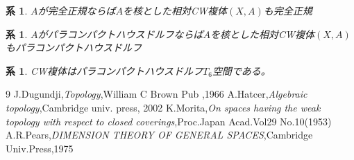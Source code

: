 \documentclass[leqno]{jsarticle}
\newtheorem{cor}[thm]{系}
\begin{document}
\begin{cor}
$A$が完全正規ならば$A$を核とした相対CW複体$(X,A)$も完全正規
\end{cor}

\begin{cor}
$A$がパラコンパクトハウスドルフならば$A$を核とした相対CW複体$(X,A)$もパラコンパクトハウスドルフ
\end{cor}

\begin{cor}
CW複体はパラコンパクトハウスドルフ$T_6$空間である。
\end{cor}
	
\begin{thebibliography}{9}
J.Dugundji,{\it Topology},William C Brown Pub ,1966
A.Hatcer,{\it Algebraic topology},Cambridge univ. press, 2002 
K.Morita,{\it On spaces having the weak topology with respect to closed coverings},Proc.Japan Acad.Vol29 No.10(1953)
A.R.Pears,{\it DIMENSION THEORY OF GENERAL SPACES},Cambridge Univ.Press,1975
\end{thebibliography}




			
\end{document}

